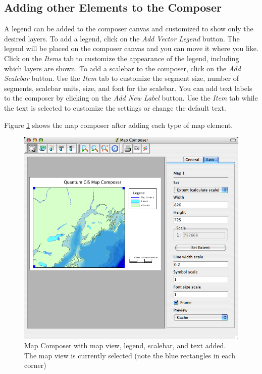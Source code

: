\subsection{Adding other Elements to the Composer}
A
legend can be added to the composer canvas and customized to show only the
desired layers. To add a legend, click on the \textit{Add Vector Legend}
button. The legend will be placed on the composer canvas and you can move it
where you like. Click on the \textit{Items} tab to customize the appearance of
the legend, including which layers are shown.
To add
a scalebar to the composer, click on the \textit{Add Scalebar} button. Use the
\textit{Item} tab to customize the segment size, number of segments, scalebar
units, size, and font for the scalebar.
You can
add text labels to the composer by clicking on the \textit{Add New Label}
button. Use the \textit{Item} tab while the text is selected to customize the
settings or change the default text.

Figure \ref{fig:map_composer_complete} shows the map composer after adding
each type of map element.
\begin{figure}[h]
   \begin{center}
   \caption{Map Composer with map view, legend, scalebar, and text added. The
   map view is currently selected (note the blue rectangles in each corner)}\label{fig:map_composer_complete}\smallskip
   \includegraphics[scale=.70]{qgis_user_guide_images/map_composer}
\end{center}  
\end{figure}

